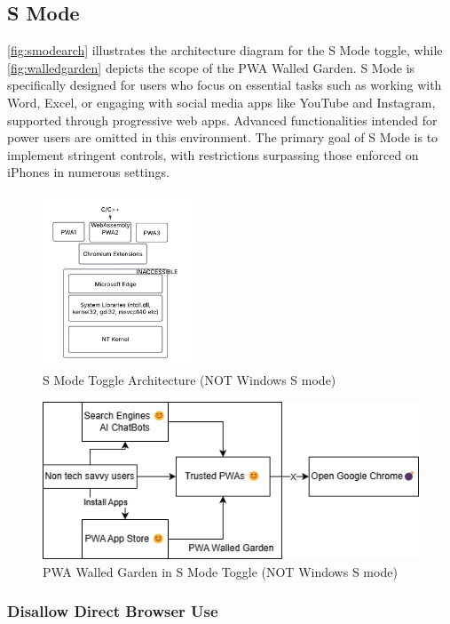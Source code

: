 \subsection{S Mode}

\autoref{fig:smodearch} illustrates the architecture diagram for the S Mode toggle, while \autoref{fig:walledgarden} depicts the scope of the PWA Walled Garden. S Mode is specifically designed for users who focus on essential tasks such as working with Word, Excel, or engaging with social media apps like YouTube and Instagram, supported through progressive web apps. Advanced functionalities intended for power users are omitted in this environment. The primary goal of S Mode is to implement stringent controls, with restrictions surpassing those enforced on iPhones in numerous settings.

\begin{figure}[h!]
\centering
\includegraphics[width=0.4\textwidth]{smodearch.png}
\caption{S Mode Toggle Architecture (NOT Windows S mode)}
\label{fig:smodearch} %
\end{figure}

\begin{figure}[h!]
    \centering
    \includegraphics[width=0.6\linewidth]{walledgarden.png}
    \caption{PWA Walled Garden in S Mode Toggle (NOT Windows S mode)}
    \label{fig:walledgarden}
\end{figure}

\subsubsection{Disallow Direct Browser Use}

